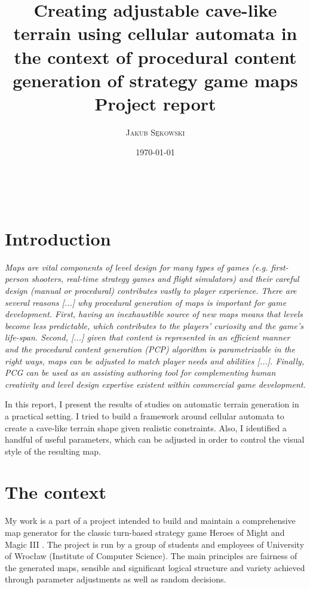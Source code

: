 \documentclass[a4paper, 11pt]{article} %
\title{\Large \textbf{Creating adjustable cave-like terrain using cellular automata in the context of procedural content generation of strategy game maps} \\ %
\large{Project report}} %
\author{\textsc{Jakub Sękowski} %
\\{\textit{}}} %
\date{\today} %
\makeatletter
\renewcommand{\maketitle}{ %
\begin{flushright} %
{\LARGE\@title} %

\vspace{70pt} %

{\large\@author} %
\\\@date %

\vspace{40pt} %
\end{flushright}
}
\makeatother
\begin{document}
\maketitle %

\vspace{60pt}


\section*{Introduction}

\textit{Maps are vital components of level design for many types of games (e.g. first-person shooters, real-time strategy games and flight simulators) and their careful design (manual or procedural) contributes vastly to player experience. There are several reasons [...] why procedural generation of maps is important for game development. First, having an inexhaustible source of new maps means that levels become less predictable, which contributes to the players’ curiosity and the game’s life-span. Second, [...] given that content is represented in an efficient manner and the procedural content generation (PCP) algorithm is parametrizable in the right ways, maps can be adjusted to match player needs and abilities [...]. Finally, PCG can be used as an assisting authoring tool for complementing human creativity and level design expertise existent within commercial game development.} \cite{paper}

In this report, I present the results of studies on automatic terrain generation in a practical setting. I tried to build a framework around cellular automata to create a cave-like terrain shape given realistic constraints. Also, I identified a handful of useful parameters, which can be adjusted in order to control the visual style of the resulting map.


\section*{The context}

My work is a part of a project intended to build and maintain a comprehensive map generator for the classic turn-based strategy game Heroes of Might and Magic III \cite{h3}. The project is run by a group of students and employees of University of Wrocław (Institute of Computer Science). The main principles are fairness of the generated maps, sensible and significant logical structure and variety achieved through parameter adjustments as well as random decisions.
\end{document}
